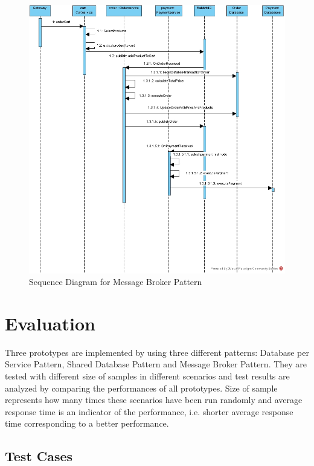 \documentclass{article}
\begin{document}
\begin{figure}[h!]
\centering
\includegraphics[scale=0.50, angle=90]{sequence_Message Broker.jpg}
\caption{Sequence Diagram for Message Broker Pattern}
\label{fig:seq_broker}
\end{figure}

\pagebreak

\section{Evaluation}

Three prototypes are implemented by using three different patterns: Database per Service Pattern, Shared Database Pattern and Message Broker Pattern. They are tested with different size of samples in different scenarios and test results are analyzed by comparing the performances of all prototypes. Size of sample represents how many times these scenarios have been run randomly and average response time is an indicator of the performance, i.e. shorter average response time corresponding to a better performance.  

\subsection{Test Cases}
\end{document}

